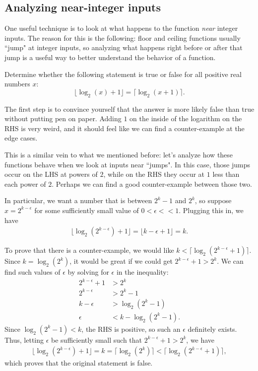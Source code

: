 \documentclass[mast]{lucky}
\begin{document}
\subsection{Analyzing near-integer inputs}

One useful technique is to look at what happens to the function \emph{near} integer inputs. The reason for this is the following: floor and ceiling functions usually ``jump" at integer inputs, so analyzing what happens right before or after that jump is a useful way to better understand the behavior of a function.

\begin{exam}
Determine whether the following statement is true or false for all positive real numbers $x$:
\[ \lfloor \log_2 (x) + 1 \rfloor = \lceil \log_2 (x + 1) \rceil. \]
\end{exam}

\begin{sol}
The first step is to convince yourself that the answer is more likely false than true without putting pen on paper. Adding $1$ on the inside of the logarithm on the RHS is very weird, and it should feel like we can find a counter-example at the edge cases.

This is a similar vein to what we mentioned before: let's analyze how these functions behave when we look at inputs near ``jumps". In this case, those jumps occur on the LHS at powers of $2$, while on the RHS they occur at $1$ less than each power of $2$. Perhaps we can find a good counter-example between those two.

In particular, we want a number that is between $2^k - 1$ and $2^k$, so suppose $x = 2^{k - \epsilon}$ for some sufficiently small value of $0  < \epsilon << 1$.  Plugging this in, we have
\begin{align*}
\lfloor \log_2 (2^{k - \epsilon}) + 1 \rfloor = \lfloor k - \epsilon + 1 \rfloor = k.
\end{align*}

To prove that there is a counter-example, we would like $k < \lceil \log_2 (2^{k - \epsilon} + 1) \rceil$. Since $k = \log_2 (2^k)$, it would be great if we could get $2^{k - \epsilon} + 1 > 2^k$. We can find such values of $\epsilon$ by solving for $\epsilon$ in the inequality:
\begin{align*}
2^{k - \epsilon} + 1 &> 2^k \\
2^{k - \epsilon} &> 2^k - 1 \\
k - \epsilon &> \log_2 (2^k - 1) \\
\epsilon &< k - \log_2 (2^k - 1).
\end{align*}
Since $\log_2 (2^k - 1) < k$, the RHS is positive, so such an $\epsilon$ definitely exists.  Thus, letting $\epsilon$ be sufficiently small such that $2^{k - \epsilon} + 1 > 2^k$, we have
\begin{align*}
\lfloor \log_2 (2^{k - \epsilon}) + 1 \rfloor = k = \lceil \log_2 (2^k) \rceil   <  \lceil \log_2 (2^{k - \epsilon} + 1) \rceil,
\end{align*}
which proves that the original statement is false.
\end{sol}
\end{document}
